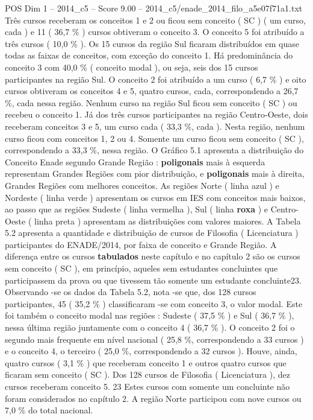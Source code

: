 \begin{textsample}{POS Dim 1 – 2014\_c5 – Score 9.00 – 2014\_c5/enade\_2014\_filo\_a5e07f71a1.txt}
Três cursos receberam os conceitos 1 e 2 ou ficou sem conceito ( SC ) ( um curso, cada ) e 11 ( 36,7 \% ) cursos obtiveram o conceito 3.
O conceito 5 foi atribuído a três cursos ( 10,0 \% ).
Os 15 cursos da região Sul ficaram distribuídos em quase todas as faixas de conceitos, com exceção do conceito 1.
Há predominância do conceito 3 com 40,0 \% ( conceito modal ), ou seja, seis dos 15 cursos participantes na região Sul.
O conceito 2 foi atribuído a um curso ( 6,7 \% ) e oito cursos obtiveram os conceitos 4 e 5, quatro cursos, cada, correspondendo a 26,7 \%, cada nessa região.
Nenhum curso na região Sul ficou sem conceito ( SC ) ou recebeu o conceito 1.
Já dos três cursos participantes na região Centro-Oeste, dois receberam conceitos 3 e 5, um curso cada ( 33,3 \%, cada ).
Nesta região, nenhum curso ficou com conceitos 1, 2 ou 4.
Somente um curso ficou sem conceito ( SC ), correspondendo a 33,3 \%, nessa região.
O Gráfico 5.1 apresenta a distribuição do Conceito Enade segundo Grande Região : \textbf{poligonais} mais à esquerda representam Grandes Regiões com pior distribuição, e \textbf{poligonais} mais à direita, Grandes Regiões com melhores conceitos.
As regiões Norte ( linha azul ) e Nordeste ( linha verde ) apresentam os cursos em IES com conceitos mais baixos, ao passo que as regiões Sudeste ( linha vermelha ), Sul ( linha \textbf{roxa} ) e Centro-Oeste ( linha preta ) apresentam as distribuições com valores maiores.
A Tabela 5.2 apresenta a quantidade e distribuição de cursos de Filosofia ( Licenciatura ) participantes do ENADE/2014, por faixa de conceito e Grande Região.
A diferença entre os cursos \textbf{tabulados} neste capítulo e no capítulo 2 são os cursos sem conceito ( SC ), em princípio, aqueles sem estudantes concluintes que participassem da prova ou que tivessem tão somente um estudante concluinte23.
Observando -se os dados da Tabela 5.2, nota -se que, dos 128 cursos participantes, 45 ( 35,2 \% ) classificaram -se com conceito 3, o valor modal.
Este foi também o conceito modal nas regiões : Sudeste ( 37,5 \% ) e Sul ( 36,7 \% ), nessa última região juntamente com o conceito 4 ( 36,7 \% ).
O conceito 2 foi o segundo mais frequente em nível nacional ( 25,8 \%, correspondendo a 33 cursos ) e o conceito 4, o terceiro ( 25,0 \%, correspondendo a 32 cursos ).
Houve, ainda, quatro cursos ( 3,1 \% ) que receberam conceito 1 e outros quatro cursos que ficaram sem conceito ( SC ).
Dos 128 cursos de Filosofia ( Licenciatura ), dez cursos receberam conceito 5. 23 Estes cursos com somente um concluinte não foram considerados no capítulo 2.
A região Norte participou com nove cursos ou 7,0 \% do total nacional.

\end{textsample}
